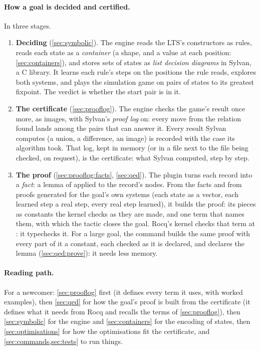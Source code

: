 \paragraph{How a goal is decided and certified.} In three stages.
\begin{enumerate}
\item \textbf{Deciding} (\cref{sec:symbolic}). The engine reads the LTS's
  constructors as rules, reads each state as a \emph{container} (a shape,
  and a value at each position: \cref{sec:containers}), and stores sets of
  states as \emph{list decision diagrams} in Sylvan, a C library. It learns
  each rule's steps on the positions the rule reads, explores both systems,
  and plays the simulation game on pairs of states to its greatest
  fixpoint. The verdict is whether the start pair is in it.
\item \textbf{The certificate} (\cref{sec:prooflog}). The engine
  checks the game's result once more, as images, with Sylvan's \emph{proof log} on: every move from
  the relation found lands among the pairs that can answer it. Every
  result Sylvan computes (a union, a difference, an image) is recorded
  with the case its algorithm took. That log, kept in memory (or in a file
  next to the file being checked, on request), is the certificate: what
  Sylvan computed, step by step.
\item \textbf{The proof} (\cref{sec:prooflog:facts}, \cref{sec:qed}). The
  plugin turns each record into a \emph{fact}: a lemma of
   applied to the record's nodes. From the facts
  and from proofs generated for the goal's own systems (each state as a
  vector, each learned step a real step, every real step learned), it
  builds the proof: its pieces as constants the kernel checks as they are
  made, and one term that names them, with which the tactic closes the
  goal. Rocq's kernel checks that term at : it typechecks it.
  For a large goal, the command  builds the same proof
  with every part of it a constant, each checked as it is declared, and
  declares the lemma (\cref{sec:qed:prove}): it needs less memory.
\end{enumerate}

\paragraph{Reading path.} For a newcomer: \cref{sec:prooflog} first (it
defines every term it uses, with worked examples), then \cref{sec:qed}
for how the goal's proof is built from the certificate (it defines what
it needs from Rocq and recalls the terms of \cref{sec:prooflog}), then
\cref{sec:symbolic} for the engine and \cref{sec:containers} for the
encoding of states, then \cref{sec:optimisations} for how the
optimisations fit the certificate, and \cref{sec:commands,sec:tests} to
run things.
